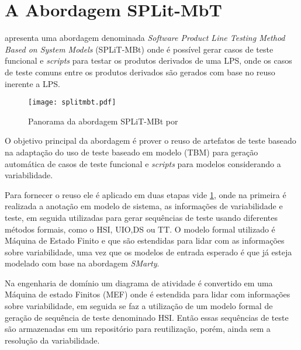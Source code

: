 	
%	

\section{A Abordagem SPLit-MbT}

\cite{costa2016split} apresenta uma abordagem denominada \textit{Software Product Line Testing Method Based on System Models} (SPLiT-MBt) onde é possível gerar casos de teste funcional e \textit{scripts} para testar os produtos derivados de uma LPS, onde os casos de teste comuns entre os produtos derivados são gerados com base no reuso inerente a LPS.

\begin{figure}[htb]
	\centering
	\texttt{[image: splitmbt.pdf]}
	\caption{Panorama da abordagem SPLiT-MBt por \citealp{costa2016split}}
	\label{fig:splitmbt}
\end{figure}

O objetivo principal da abordagem é prover o reuso de artefatos de teste baseado na adaptação do uso de teste baseado em modelo (TBM) para geração automática de casos de teste funcional e \textit{scripts} para modelos considerando a variabilidade.

Para fornecer o reuso ele é aplicado em duas etapas vide \ref{fig:splitmbt}, onde na primeira é realizada a anotação em modelo de sistema, as informações de variabilidade e teste, em seguida utilizadas para gerar sequências de teste usando diferentes métodos formais, como o HSI, UIO,DS ou TT. O modelo formal utilizado é Máquina de Estado Finito e que são estendidas para lidar com as informações sobre variabilidade, uma vez que os modelos de entrada esperado é que já esteja modelado com base na abordagem \textit{SMarty}.

Na engenharia de domínio um diagrama de atividade é convertido em uma Máquina de estado Finitos (MEF) onde é estendida para lidar com informações sobre variabilidade, em seguida se faz a utilização de um modelo formal de geração de sequência de teste denominado HSI. Então essas sequências de teste são armazenadas em um repositório para reutilização, porém, ainda sem a resolução da variabilidade.

